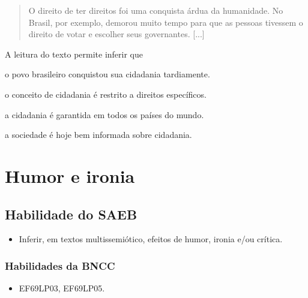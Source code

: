 \begin{quote}
O direito de ter direitos foi uma conquista árdua da humanidade. No
Brasil, por exemplo, demorou muito tempo para que as pessoas tivessem o
direito de votar e escolher seus governantes. {[}...{]}
\end{quote}


A leitura do texto permite inferir que

\begin{escolha}
\item o povo brasileiro conquistou sua cidadania tardiamente.

\item o conceito de cidadania é restrito a direitos específicos.

\item a cidadania é garantida em todos os países do mundo.

\item a sociedade é hoje bem informada sobre cidadania.
\end{escolha}

\chapter{Humor e ironia}

\section{Habilidade do SAEB}

\begin{itemize}
\item Inferir, em textos multissemiótico, efeitos de humor, ironia e/ou crítica.
\end{itemize}

\subsection{Habilidades da BNCC}

\begin{itemize}
\tightlist
\item
  EF69LP03, EF69LP05.
\end{itemize}

